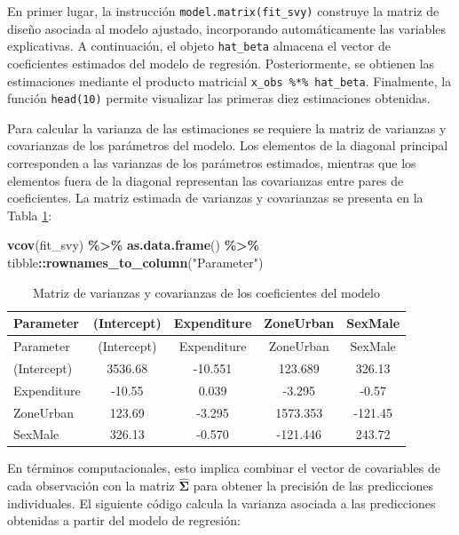 \documentclass[
  spanish,
  12pt,
]{book}
\newenvironment{Shaded}{\begin{snugshade}}{\end{snugshade}}
\newcommand{\FunctionTok}[1]{\textcolor[rgb]{0.13,0.29,0.53}{\textbf{#1}}}
\newcommand{\NormalTok}[1]{#1}
\newcommand{\SpecialCharTok}[1]{\textcolor[rgb]{0.81,0.36,0.00}{\textbf{#1}}}
\newcommand{\StringTok}[1]{\textcolor[rgb]{0.31,0.60,0.02}{#1}}
\begin{document}
En primer lugar, la instrucción \texttt{model.matrix(fit\_svy)} construye la matriz de diseño asociada al modelo ajustado, incorporando automáticamente las variables explicativas. A continuación, el objeto \texttt{hat\_beta} almacena el vector de coeficientes estimados del modelo de regresión. Posteriormente, se obtienen las estimaciones mediante el producto matricial \texttt{x\_obs\ \%*\%\ hat\_beta}. Finalmente, la función \texttt{head(10)} permite visualizar las primeras diez estimaciones obtenidas.

Para calcular la varianza de las estimaciones se requiere la matriz de varianzas y covarianzas de los parámetros del modelo. Los elementos de la diagonal principal corresponden a las varianzas de los parámetros estimados, mientras que los elementos fuera de la diagonal representan las covarianzas entre pares de coeficientes. La matriz estimada de varianzas y covarianzas se presenta en la Tabla \ref{tab:tab-vcov-modelo}:

\begin{Shaded}
\begin{Highlighting}[]
\FunctionTok{vcov}\NormalTok{(fit\_svy) }\SpecialCharTok{\%\textgreater{}\%}
  \FunctionTok{as.data.frame}\NormalTok{() }\SpecialCharTok{\%\textgreater{}\%}
\NormalTok{  tibble}\SpecialCharTok{::}\FunctionTok{rownames\_to\_column}\NormalTok{(}\StringTok{"Parameter"}\NormalTok{)}
\end{Highlighting}
\end{Shaded}

\begin{longtable}[]{@{}lcccc@{}}
\caption{\label{tab:tab-vcov-modelo}Matriz de varianzas y covarianzas de los coeficientes del modelo}\tabularnewline
\toprule\noalign{}
Parameter & (Intercept) & Expenditure & ZoneUrban & SexMale \\
\midrule\noalign{}
\endfirsthead
\toprule\noalign{}
Parameter & (Intercept) & Expenditure & ZoneUrban & SexMale \\
\midrule\noalign{}
\endhead
\bottomrule\noalign{}
\endlastfoot
(Intercept) & 3536.68 & -10.551 & 123.689 & 326.13 \\
Expenditure & -10.55 & 0.039 & -3.295 & -0.57 \\
ZoneUrban & 123.69 & -3.295 & 1573.353 & -121.45 \\
SexMale & 326.13 & -0.570 & -121.446 & 243.72 \\
\end{longtable}

En términos computacionales, esto implica combinar el vector de covariables de cada observación con la matriz \(\hat{\boldsymbol{\Sigma}}\) para obtener la precisión de las predicciones individuales. El siguiente código calcula la varianza asociada a las predicciones obtenidas a partir del modelo de regresión:
\end{document}
